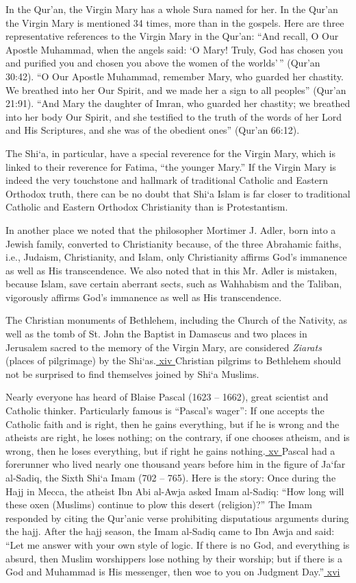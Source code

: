In the Qur'an, the Virgin Mary has a whole Sura named for her. In the Qur'an the Virgin Mary is mentioned 34 times, more than in the gospels. Here are three representative references to the Virgin Mary in the Qur'an: ``And recall, O Our Apostle Muhammad, when the angels said: `O Mary! Truly, God has chosen you and purified you and chosen you above the women of the worlds'\,'' (Qur'an 30:42). ``O Our Apostle Muhammad, remember Mary, who guarded her chastity. We breathed into her Our Spirit, and we made her a sign to all peoples'' (Qur'an 21:91). ``And Mary the daughter of Imran, who guarded her chastity; we breathed into her body Our Spirit, and she testified to the truth of the words of her Lord and His Scriptures, and she was of the obedient ones'' (Qur'an 66:12).

The Shi`a, in particular, have a special reverence for the Virgin Mary, which is linked to their reverence for Fatima, ``the younger Mary.'' If the Virgin Mary is indeed the very touchstone and hallmark of traditional Catholic and Eastern Orthodox truth, there can be no doubt that Shi`a Islam is far closer to traditional Catholic and Eastern Orthodox Christianity than is Protestantism.

In another place we noted that the philosopher Mortimer J. Adler, born into a Jewish family, converted to Christianity because, of the three Abrahamic faiths, i.e., Judaism, Christianity, and Islam, only Christianity affirms God's immanence as well as His transcendence. We also noted that in this Mr. Adler is mistaken, because Islam, save certain aberrant sects, such as Wahhabism and the Taliban, vigorously affirms God's immanence as well as His transcendence.

The Christian monuments of Bethlehem, including the Church of the Nativity, as well as the tomb of St. John the Baptist in Damascus and two places in Jerusalem sacred to the memory of the Virgin Mary, are considered \emph{Ziarats} (places of pilgrimage) by the Shi`as.\hyperref[_edn14]{ xiv } Christian pilgrims to Bethlehem should not be surprised to find themselves joined by Shi`a Muslims.

Nearly everyone has heard of Blaise Pascal (1623 -- 1662), great scientist and Catholic thinker. Particularly famous is ``Pascal's wager'': If one accepts the Catholic faith and is right, then he gains everything, but if he is wrong and the atheists are right, he loses nothing; on the contrary, if one chooses atheism, and is wrong, then he loses everything, but if right he gains nothing.\hyperref[_edn15]{ xv } Pascal had a forerunner who lived nearly one thousand years before him in the figure of Ja`far al-Sadiq, the Sixth Shi`a Imam (702 -- 765). Here is the story: Once during the Hajj in Mecca, the atheist Ibn Abi al-Awja asked Imam al-Sadiq: ``How long will these oxen (Muslims) continue to plow this desert (religion)?'' The Imam responded by citing the Qur'anic verse prohibiting disputatious arguments during the hajj. After the hajj season, the Imam al-Sadiq came to Ibn Awja and said: ``Let me answer with your own style of logic. If there is no God, and everything is absurd, then Muslim worshippers lose nothing by their worship; but if there is a God and Muhammad is His messenger, then woe to you on Judgment Day.''\hyperref[_edn16]{ xvi }

